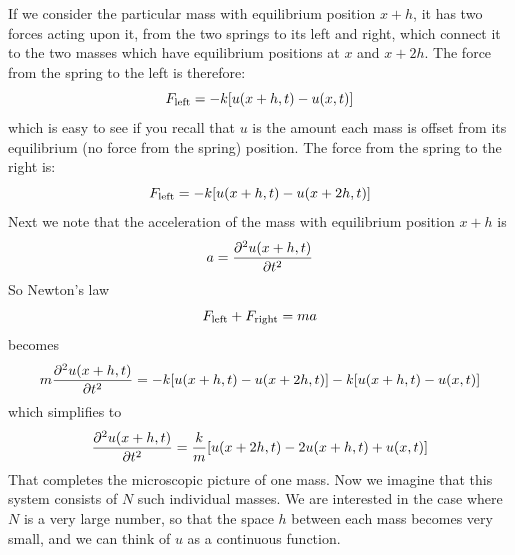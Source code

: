\documentclass[12pt]{article}
\begin{document}
If we consider the particular mass with equilibrium position $x+h$, it has two forces acting upon it, from the two springs to its left and right, which connect it to the two masses which have equilibrium positions at $x$ and $x+2h$.  The force from the spring to the left is therefore:
\begin{displaymath}
F_{\rm left} = - k [ u(x+h,t) - u(x,t) ]
\end{displaymath}
which is easy to see if you recall that $u$ is the amount each mass is offset from its equilibrium (no force from the spring) position.  The force from the spring to the right is:
\begin{displaymath}
F_{\rm left} =  - k [ u(x+h,t) - u(x+2h,t) ]
\end{displaymath}
Next we note that the acceleration of the mass with equilibrium position $x+h$ is
\begin{displaymath}
a =  \frac{\partial^2 u(x+h,t)}{\partial t^2}
\end{displaymath}
So Newton's law 
\begin{displaymath}
{F_{\rm left} + F_{\rm right}} = m a
\end{displaymath}
becomes
\begin{displaymath}
m \frac{\partial^2 u(x+h,t)}{\partial t^2} = - k [ u(x+h,t) - u(x+2h,t)] - k [ u(x+h,t) - u(x,t)] 
\end{displaymath}
which simplifies to
\begin{displaymath}
\frac{\partial^2 u(x+h,t)}{\partial t^2} = \frac{k}{m} [ u(x+2h,t) - 2 u(x+h,t) + u(x,t)]
\end{displaymath}
That completes the microscopic picture of one mass.  Now we imagine that this system consists of $N$ such individual masses.  We are interested in the case where $N$ is a very large number, so that the space $h$ between each mass becomes very small, and we can think of $u$ as a continuous function.  
\end{document}
